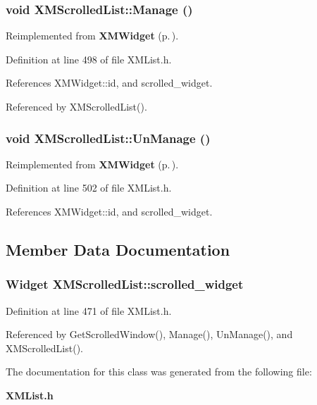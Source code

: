 \subsubsection{\setlength{\rightskip}{0pt plus 5cm}void XMScrolled\-List::Manage ()\hspace{0.3cm}{\tt  [inline]}}\label{classXMScrolledList_a3}




Reimplemented from {\bf XMWidget} {\rm (p.\,\pageref{classXMWidget_a16})}.

Definition at line 498 of file XMList.h.

References XMWidget::id, and scrolled\_\-widget.

Referenced by XMScrolled\-List().
\subsubsection{\setlength{\rightskip}{0pt plus 5cm}void XMScrolled\-List::Un\-Manage ()\hspace{0.3cm}{\tt  [inline]}}\label{classXMScrolledList_a4}




Reimplemented from {\bf XMWidget} {\rm (p.\,\pageref{classXMWidget_a17})}.

Definition at line 502 of file XMList.h.

References XMWidget::id, and scrolled\_\-widget.

\subsection{Member Data Documentation}
\subsubsection{\setlength{\rightskip}{0pt plus 5cm}Widget XMScrolled\-List::scrolled\_\-widget\hspace{0.3cm}{\tt  [protected]}}\label{classXMScrolledList_n0}




Definition at line 471 of file XMList.h.

Referenced by Get\-Scrolled\-Window(), Manage(), Un\-Manage(), and XMScrolled\-List().

The documentation for this class was generated from the following file:\begin{CompactItemize}
\item 
{\bf XMList.h}\end{CompactItemize}
